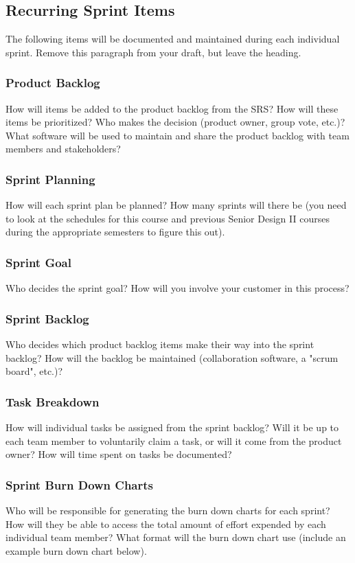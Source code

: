 \subsection{Recurring Sprint Items}
The following items will be documented and maintained during each individual sprint. Remove this paragraph from your draft, but leave the heading.

\subsubsection{Product Backlog}
How will items be added to the product backlog from the SRS? How will these items be prioritized? Who makes the decision (product owner, group vote, etc.)? What software will be used to maintain and share the product backlog with team members and stakeholders?

\subsubsection{Sprint Planning}
How will each sprint plan be planned? How many sprints will there be (you need to look at the schedules for this course and previous Senior Design II courses during the appropriate semesters to figure this out).

\subsubsection{Sprint Goal}
Who decides the sprint goal? How will you involve your customer in this process?

\subsubsection{Sprint Backlog}
Who decides which product backlog items make their way into the sprint backlog? How will the backlog be maintained (collaboration software, a "scrum board", etc.)?

\subsubsection{Task Breakdown}
How will individual tasks be assigned from the sprint backlog? Will it be up to each team member to voluntarily claim a task, or will it come from the product owner? How will time spent on tasks be documented?

\subsubsection{Sprint Burn Down Charts}
Who will be responsible for generating the burn down charts for each sprint? How will they be able to access the total amount of effort expended by each individual team member? What format will the burn down chart use (include an example burn down chart below).

